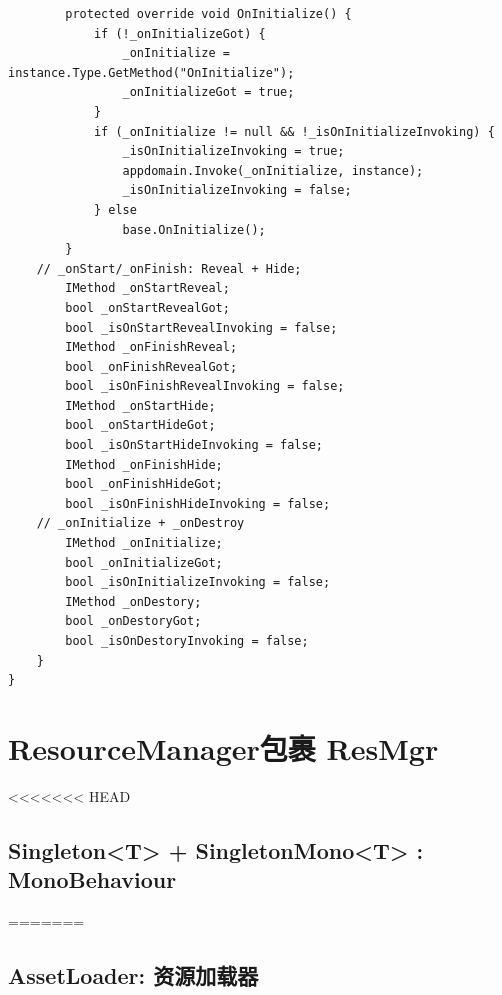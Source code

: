 \documentclass[9pt, b5paper]{article}
\begin{document}
\begin{verbatim}
        protected override void OnInitialize() {
            if (!_onInitializeGot) {
                _onInitialize = instance.Type.GetMethod("OnInitialize");
                _onInitializeGot = true;
            }
            if (_onInitialize != null && !_isOnInitializeInvoking) {
                _isOnInitializeInvoking = true;
                appdomain.Invoke(_onInitialize, instance);
                _isOnInitializeInvoking = false;
            } else 
                base.OnInitialize();
        }       
    // _onStart/_onFinish: Reveal + Hide;
        IMethod _onStartReveal;
        bool _onStartRevealGot;
        bool _isOnStartRevealInvoking = false;
        IMethod _onFinishReveal;
        bool _onFinishRevealGot;
        bool _isOnFinishRevealInvoking = false;
        IMethod _onStartHide;
        bool _onStartHideGot;
        bool _isOnStartHideInvoking = false;
        IMethod _onFinishHide;
        bool _onFinishHideGot;
        bool _isOnFinishHideInvoking = false;
    // _onInitialize + _onDestroy
        IMethod _onInitialize;
        bool _onInitializeGot;
        bool _isOnInitializeInvoking = false;
        IMethod _onDestory;
        bool _onDestoryGot;
        bool _isOnDestoryInvoking = false;
    }
}
\end{verbatim}


\section{ResourceManager包裹  ResMgr}
\label{sec-7}
<<<<<<< HEAD
\subsection{Singleton<T> + SingletonMono<T> : MonoBehaviour}
\label{sec-7-1}
=======
\subsection{AssetLoader:  资源加载器}
\label{sec-7-1}
\end{document}
